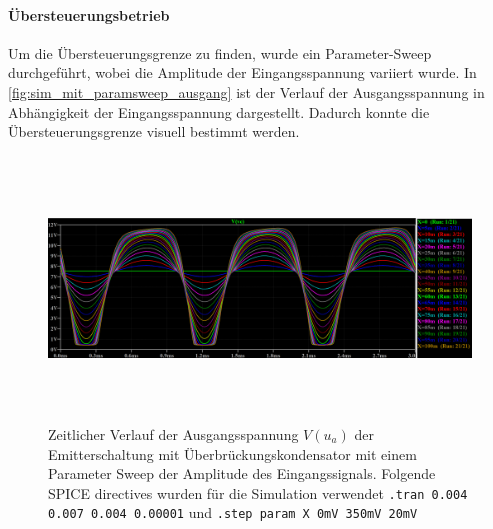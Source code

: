 \documentclass[12pt,english,ngerman]{scrartcl}
\begin{document}
\paragraph{Übersteuerungsbetrieb}

Um die Übersteuerungsgrenze zu finden, wurde ein Parameter-Sweep durchgeführt,
wobei die Amplitude der Eingangsspannung variiert wurde. In 
\autoref{fig:sim_mit_paramsweep_ausgang} ist der Verlauf der Ausgangsspannung
in Abhängigkeit der Eingangsspannung dargestellt. Dadurch konnte die
Übersteuerungsgrenze visuell bestimmt werden.

\begin{figure}[H]
    \centering
   \includegraphics[width=\linewidth, height=7cm]{./figures/mitkond/parametersweepuebersteurung.png}
    \caption{Zeitlicher Verlauf der Ausgangsspannung $V(u_a)$
    der Emitterschaltung mit Überbrückungskondensator mit einem Parameter Sweep der Amplitude des Eingangssignals.
    Folgende SPICE directives wurden für die Simulation verwendet
    \texttt{.tran 0.004 0.007 0.004 0.00001} und \texttt{.step param X 0mV 350mV 20mV}}
    \label{fig:sim_mit_paramsweep_ausgang}
\end{figure}



\end{document}
